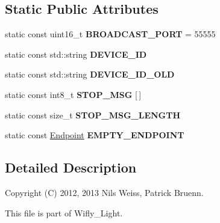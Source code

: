 \subsection*{Static Public Attributes}
\begin{DoxyCompactItemize}
\item 
\hypertarget{class_broadcast_receiver_a38d37ce60dc1fb1e0dbc08d80b5d3b47}{static const uint16\-\_\-t {\bfseries B\-R\-O\-A\-D\-C\-A\-S\-T\-\_\-\-P\-O\-R\-T} = 55555}\label{class_broadcast_receiver_a38d37ce60dc1fb1e0dbc08d80b5d3b47}

\item 
\hypertarget{class_broadcast_receiver_a7314a4107fc6e1c3d8dbace2b47c07d1}{static const std\-::string {\bfseries D\-E\-V\-I\-C\-E\-\_\-\-I\-D}}\label{class_broadcast_receiver_a7314a4107fc6e1c3d8dbace2b47c07d1}

\item 
\hypertarget{class_broadcast_receiver_addb5597142e98c3c16afce397082d960}{static const std\-::string {\bfseries D\-E\-V\-I\-C\-E\-\_\-\-I\-D\-\_\-\-O\-L\-D}}\label{class_broadcast_receiver_addb5597142e98c3c16afce397082d960}

\item 
\hypertarget{class_broadcast_receiver_a8a59a09e4b750cc992d9aab3a4c06a33}{static const int8\-\_\-t {\bfseries S\-T\-O\-P\-\_\-\-M\-S\-G} \mbox{[}$\,$\mbox{]}}\label{class_broadcast_receiver_a8a59a09e4b750cc992d9aab3a4c06a33}

\item 
\hypertarget{class_broadcast_receiver_afa28d7c0a9058e830c7586e33acc6b69}{static const size\-\_\-t {\bfseries S\-T\-O\-P\-\_\-\-M\-S\-G\-\_\-\-L\-E\-N\-G\-T\-H}}\label{class_broadcast_receiver_afa28d7c0a9058e830c7586e33acc6b69}

\item 
\hypertarget{class_broadcast_receiver_a545fbd086416bfa77cd42b531d045a5b}{static const \hyperlink{class_endpoint}{Endpoint} {\bfseries E\-M\-P\-T\-Y\-\_\-\-E\-N\-D\-P\-O\-I\-N\-T}}\label{class_broadcast_receiver_a545fbd086416bfa77cd42b531d045a5b}

\end{DoxyCompactItemize}


\subsection{Detailed Description}
Copyright (C) 2012, 2013 Nils Weiss, Patrick Bruenn.

This file is part of Wifly\-\_\-\-Light.

